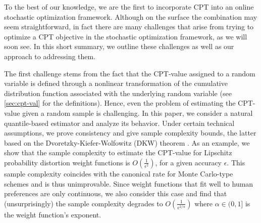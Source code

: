 To the  best of our knowledge, we are the first to incorporate CPT into an online stochastic optimization framework. Although on the surface the combination may seem straightforward, in fact there are many challenges that arise from trying to optimize a CPT objective in the stochastic optimization framework, as we will soon see. 
In this short summary, we outline these challenges as well as our approach to addressing them. 

The first challenge stems from the fact that the CPT-value assigned to a random variable is defined through a nonlinear transformation of the cumulative distribution function associated with the underlying random variable (see \cref{sec:cpt-val} for the definitions). 
Hence, even the problem of estimating the CPT-value given a random sample is challenging.
In this paper, we consider a natural quantile-based estimator and analyze its behavior.
Under certain technical assumptions, we prove consistency and give sample complexity bounds, the latter based on the
 Dvoretzky-Kiefer-Wolfowitz (DKW) theorem \cite[Chapter 2]{wasserman2006}.
As an example, we show that the sample complexity to estimate the CPT-value 
for Lipschitz probability distortion weight functions is  $O\left(\frac1{\epsilon^2}\right)$, for a given accuracy $\epsilon$. This sample complexity coincides with the canonical rate for Monte Carlo-type schemes and is thus unimprovable. Since weight functions that fit well to human preferences are only  \holder continuous, we also consider this case and find that (unsurprisingly) the sample complexity  degrades to $O\left(\frac1{\epsilon^{2/\alpha}}\right)$ where $\alpha\in (0,1]$ is the weight function's \holder exponent.

